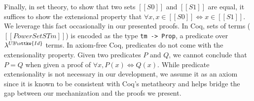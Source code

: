 \documentclass[acmsmall,screen=true,
\ifpublic review=false\else,review=true\fi
  ,anonymous=\ifanonymous true\else false\fi]{acmart}
\newcommand{\lang}{$\lambda^{U\mathbb{B}\ottkw{Id}}$\xspace}
\newcommand{\scw}[1]{}
\begin{document}
Finally, in set theory, to show that two sets $[[S0]]$ and $[[S1]]$
are equal, it suffices to show the extensional property that $\forall
x, x \in [[S0]] \iff x \in [[S1]]$. We leverage this fact
occasionally in our presented proofs.
In Coq, sets of terms ($[[PowerSet STm]]$) is encoded as the type \texttt{tm ->
Prop}, a predicate over \lang{} terms.
In axiom-free Coq, predicates do not come with the extensionality
property. Given two predicates $P$ and $Q$, we cannot conclude that
$P = Q$ when given a proof of $\forall
x, P(x) \iff Q(x)$. While
predicate extensionality is not necessary in our development, we
assume it as an axiom since it is known to be consistent with Coq's
metatheory and helps bridge the gap between our mechanization and the
proofs we present.




\end{document}
